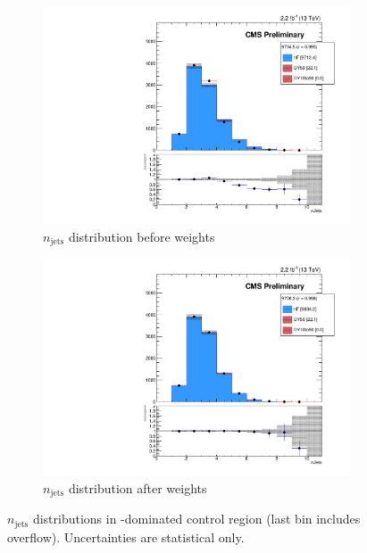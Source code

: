 \begin{figure}
\begin{center}
	\begin{subfigure}[b]{.7\textwidth}
		\includegraphics[width=\textwidth]{Background/bkg_tt/ttbar_NGOODJETS_STgt300_beforeWeights}
		\caption{$n_\textrm{jets}$ distribution before weights}
	\end{subfigure}
	\begin{subfigure}[b]{.7\textwidth}
		\includegraphics[width=\textwidth]{Background/bkg_tt/ttbar_NGOODJETS_STgt300_afterWeights}
		\caption{$n_\textrm{jets}$ distribution after weights}
	\end{subfigure}
	\caption{$n_\textrm{jets}$ distributions in \ttbar-dominated control region (last bin includes overflow). Uncertainties are statistical only. 
	\label{fig:tt/NGOODJETS}}
\end{center}
\end{figure}

